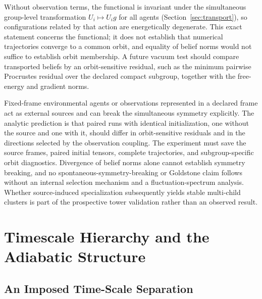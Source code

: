 \documentclass[11pt]{article}
\begin{document}
Without observation terms, the functional is invariant under the simultaneous group-level transformation $U_i\mapsto U_i g$ for all agents (Section~\ref{sec:transport}), so configurations related by that action are energetically degenerate. This exact statement concerns the functional; it does not establish that numerical trajectories converge to a common orbit, and equality of belief norms would not suffice to establish orbit membership. A future vacuum test should compare transported beliefs by an orbit-sensitive residual, such as the minimum pairwise Procrustes residual over the declared compact subgroup, together with the free-energy and gradient norms.

Fixed-frame environmental agents or observations represented in a declared frame act as external sources and can break the simultaneous symmetry explicitly. The analytic prediction is that paired runs with identical initialization, one without the source and one with it, should differ in orbit-sensitive residuals and in the directions selected by the observation coupling. The experiment must save the source frames, paired initial tensors, complete trajectories, and subgroup-specific orbit diagnostics. Divergence of belief norms alone cannot establish symmetry breaking, and no spontaneous-symmetry-breaking or Goldstone claim follows without an internal selection mechanism and a fluctuation-spectrum analysis. Whether source-induced specialization subsequently yields stable multi-child clusters is part of the prospective tower validation rather than an observed result.

\section{Timescale Hierarchy and the Adiabatic Structure}\label{sec:timescales}

\subsection{An Imposed Time-Scale Separation}
\end{document}
